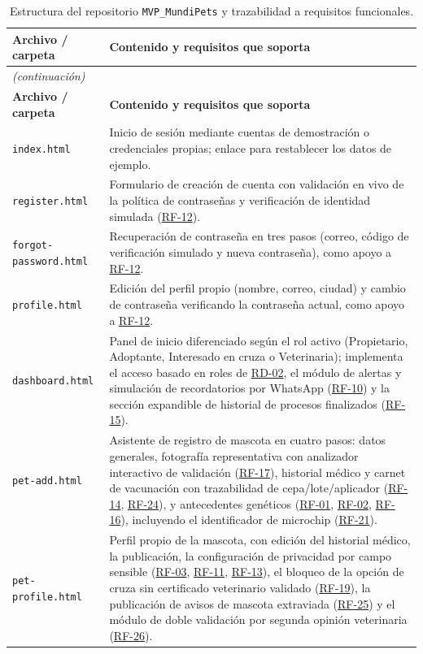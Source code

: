 \documentclass[journal,onecolumn]{IEEEtran}
\begin{document}
	\begin{longtable}{@{}p{4.2cm} p{10.6cm}@{}}
		\caption{Estructura del repositorio \texttt{MVP\_MundiPets} y trazabilidad a requisitos funcionales.}
		\label{tab:estructura-mvp} \\
		\hline
		\textbf{Archivo / carpeta} & \textbf{Contenido y requisitos que soporta} \\
		\hline
		\endfirsthead
		\multicolumn{2}{|l|}{\textit{(continuación)}} \\
		\hline
		\textbf{Archivo / carpeta} & \textbf{Contenido y requisitos que soporta} \\
		\hline
		\endhead
		\hline
		\endfoot
		\texttt{index.html} & Inicio de sesión mediante cuentas de demostración o credenciales propias; enlace para restablecer los datos de ejemplo. \\
		\hline
		\texttt{register.html} & Formulario de creación de cuenta con validación en vivo de la política de contraseñas y verificación de identidad simulada (\hyperref[tab:RF-12]{RF-12}). \\
		\hline
		\texttt{forgot-password.html} & Recuperación de contraseña en tres pasos (correo, código de verificación simulado y nueva contraseña), como apoyo a \hyperref[tab:RF-12]{RF-12}. \\
		\hline
		\texttt{profile.html} & Edición del perfil propio (nombre, correo, ciudad) y cambio de contraseña verificando la contraseña actual, como apoyo a \hyperref[tab:RF-12]{RF-12}. \\
		\hline
		\texttt{dashboard.html} & Panel de inicio diferenciado según el rol activo (Propietario, Adoptante, Interesado en cruza o Veterinaria); implementa el acceso basado en roles de \hyperref[tab:RD-02]{RD-02}, el módulo de alertas y simulación de recordatorios por WhatsApp (\hyperref[tab:RF-10]{RF-10}) y la sección expandible de historial de procesos finalizados (\hyperref[tab:RF-15]{RF-15}). \\
		\hline
		\texttt{pet-add.html} & Asistente de registro de mascota en cuatro pasos: datos generales, fotografía representativa con analizador interactivo de validación (\hyperref[tab:RF-17]{RF-17}), historial médico y carnet de vacunación con trazabilidad de cepa/lote/aplicador (\hyperref[tab:RF-14]{RF-14}, \hyperref[tab:RF-24]{RF-24}), y antecedentes genéticos (\hyperref[tab:RF-01]{RF-01}, \hyperref[tab:RF-02]{RF-02}, \hyperref[tab:RF-16]{RF-16}), incluyendo el identificador de microchip (\hyperref[tab:RF-21]{RF-21}). \\
		\hline
		\texttt{pet-profile.html} & Perfil propio de la mascota, con edición del historial médico, la publicación, la configuración de privacidad por campo sensible (\hyperref[tab:RF-03]{RF-03}, \hyperref[tab:RF-11]{RF-11}, \hyperref[tab:RF-13]{RF-13}), el bloqueo de la opción de cruza sin certificado veterinario validado (\hyperref[tab:RF-19]{RF-19}), la publicación de avisos de mascota extraviada (\hyperref[tab:RF-25]{RF-25}) y el módulo de doble validación por segunda opinión veterinaria (\hyperref[tab:RF-26]{RF-26}). \\

\end{longtable}
\end{document}
